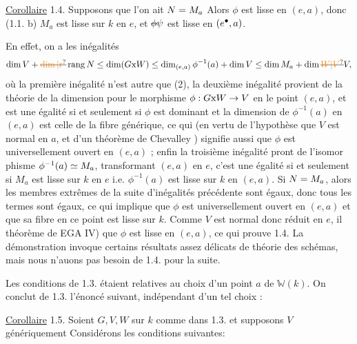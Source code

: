 \uline{Corollaire} 1.4. Supposons que l'on ait $N=M_a$\handwritten{,}  Alors $\phi$ est lisse en $(e,a)$, \deleted{\unsure{(}}donc (1.1. b) $M_a$ est lisse sur $k$ en $e$, et $\deleted{\phi}\handwritten{\psi}$ est lisse en $(e^{\bullet},a)$.

En effet, on a les inégalités
\[
\dim V+\deleted{\unsure{\dim|\mathrm{r}}}\operatorname{rang}\handwritten{N}\handwritten{\leq}
\dim(G\mathrm{x}W)\handwritten{\leq}\dim_{(e,a)}\phi^{-1}(a)+\dim V
\handwritten{\leq}\dim\handwritten{M}_a+\dim\deleted{\unsure{W|V}}\handwritten{V},
\]
où la première inégalité n'est autre que (2), la deuxième inégalité provient de la  théorie de la dimension pour le morphisme \deleted{\unsure{$\phi$}} $\phi:G\mathrm{x}W\to V$ en le point $(e,a)$, et est une égalité si et seulement si $\phi$ est dominant et la dimension de $\phi^{-1}(a)$ en $(e,a)$ est celle de la fibre générique, ce qui (en vertu de l'hypothèse que $V$ est normal en $a$, et d'un théorème de Chevalley ) signifie aussi que $\phi$ est universellement ouvert en $(e,a)$ ; enfin la troisième inégalité  pront de l'isomor%
%
%
phisme $\phi^{-1}(a)\simeq M_a$, transformant $(e,a)$ en $e$, c'est une égalité si et seulement si $M_a$ est  lisse sur $k$ en $e$ i.e. $\phi^{-1}(a)$ est lisse sur $k$ en $(e,a)$. Si  $N=M_a$, alors les membres extrêmes de la suite d'inégalités précédente sont égaux, donc tous les termes sont égaux, ce qui implique que $\phi$ est universellement ouvert en $(e,a)$ et que sa fibre en ce point est lisse sur $k$. Comme $V$ est  normal donc réduit en $e$, il  théorème de EGA IV) que $\phi$ est lisse  en $(e,a)$, ce qui prouve 1.4. La démonstration invoque certains résultats assez délicats de  théorie des schémas,  mais nous n'auons pas besoin de 1.4. pour la suite.

Les conditions de 1.3. étaient relatives au choix d'un point $a$ de $\mathbb{W}(k)$. On conclut de 1.3. l'énoncé suivant, indépendant d'un tel choix :

\uline{Corollaire} 1.5. Soient $G,V,W$ sur $k$ comme dans 1.3.  et supposons $V$ génériquement  Considérons les conditions suivantes:

